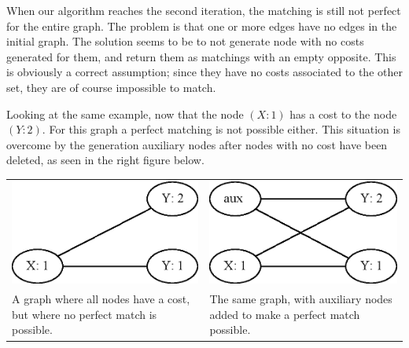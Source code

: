 \documentclass[11pt]{article}
\begin{document}
\endgroup

When our algorithm reaches the second iteration, the matching is still not perfect for the entire graph. The problem is that one or more edges have no edges in the initial graph. The solution seems to be to not generate node with no costs generated for them, and return them as matchings with an empty opposite. This is obviously a correct assumption; since they have no costs associated to the other set, they are of course impossible to match.

Looking at the same example, now that the node $(X: 1)$ has a cost to the node $(Y: 2)$. For this graph a perfect matching is not possible either. This situation is overcome by the generation auxiliary nodes after nodes with no cost have been deleted, as seen in the right figure below. \\

\begingroup
    \fontsize{7pt}{10pt}\selectfont
\begin{tabular}{ p{5.5cm} | p{5.5cm} }
   \centerline{\includegraphics[scale=0.3]{drawings/eps/TwoWayCostMatchingNotPerfect/NoFakeNode.eps}} &
    \centerline{\includegraphics[scale=0.3]{drawings/eps/TwoWayCostMatchingNotPerfect/FakeNode.eps}} \\
   A graph where all nodes have a cost, but where no perfect match is possible. &
    The same graph, with auxiliary nodes added to make a perfect match possible. \\ 
\end{tabular}
\end{document}
